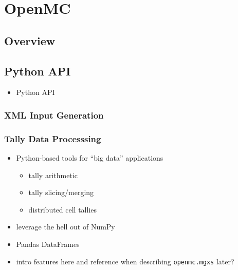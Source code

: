 \section{OpenMC}
\label{sec:openmc}


\subsection{Overview}
\label{subsec:openmc-overview}


\subsection{Python API}
\label{subsec:pyapi}

\begin{itemize}[noitemsep]
\item Python API\cite{boyd2016bigdata}
\end{itemize}


\subsubsection{XML Input Generation}
\label{subsec:pyapi}

\subsubsection{Tally Data Processsing}
\label{subsec:pyapi}

\begin{itemize}[noitemsep]
\item Python-based tools for ``big data'' applications
  \begin{itemize}[noitemsep]
    \item tally arithmetic
    \item tally slicing/merging
    \item distributed cell tallies\cite{lax2014distribcell}
    \end{itemize}
\item leverage the hell out of NumPy\cite{walt2011numpy}
\item Pandas DataFrames\cite{mckinney2010pandas}
\item intro features here and reference when describing \texttt{openmc.mgxs} later?
\end{itemize}


